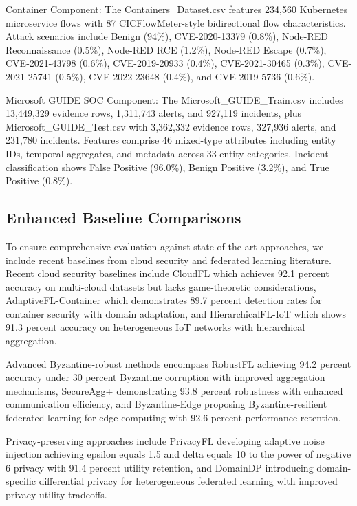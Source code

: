 \documentclass[12pt,a4paper]{article}
\theoremstyle{definition}
\begin{document}
Container Component: The Containers\_Dataset.csv features 234,560 Kubernetes microservice flows with 87 CICFlowMeter-style bidirectional flow characteristics. Attack scenarios include Benign (94\%), CVE-2020-13379 (0.8\%), Node-RED Reconnaissance (0.5\%), Node-RED RCE (1.2\%), Node-RED Escape (0.7\%), CVE-2021-43798 (0.6\%), CVE-2019-20933 (0.4\%), CVE-2021-30465 (0.3\%), CVE-2021-25741 (0.5\%), CVE-2022-23648 (0.4\%), and CVE-2019-5736 (0.6\%).

Microsoft GUIDE SOC Component: The Microsoft\_GUIDE\_Train.csv includes 13,449,329 evidence rows, 1,311,743 alerts, and 927,119 incidents, plus Microsoft\_GUIDE\_Test.csv with 3,362,332 evidence rows, 327,936 alerts, and 231,780 incidents. Features comprise 46 mixed-type attributes including entity IDs, temporal aggregates, and metadata across 33 entity categories. Incident classification shows False Positive (96.0\%), Benign Positive (3.2\%), and True Positive (0.8\%).

\subsection{Enhanced Baseline Comparisons}

To ensure comprehensive evaluation against state-of-the-art approaches, we include recent baselines from cloud security and federated learning literature. Recent cloud security baselines include CloudFL which achieves 92.1 percent accuracy on multi-cloud datasets but lacks game-theoretic considerations, AdaptiveFL-Container which demonstrates 89.7 percent detection rates for container security with domain adaptation, and HierarchicalFL-IoT which shows 91.3 percent accuracy on heterogeneous IoT networks with hierarchical aggregation.

Advanced Byzantine-robust methods encompass RobustFL achieving 94.2 percent accuracy under 30 percent Byzantine corruption with improved aggregation mechanisms, SecureAgg+ demonstrating 93.8 percent robustness with enhanced communication efficiency, and Byzantine-Edge proposing Byzantine-resilient federated learning for edge computing with 92.6 percent performance retention.

Privacy-preserving approaches include PrivacyFL developing adaptive noise injection achieving epsilon equals 1.5 and delta equals 10 to the power of negative 6 privacy with 91.4 percent utility retention, and DomainDP introducing domain-specific differential privacy for heterogeneous federated learning with improved privacy-utility tradeoffs.
\end{document}
